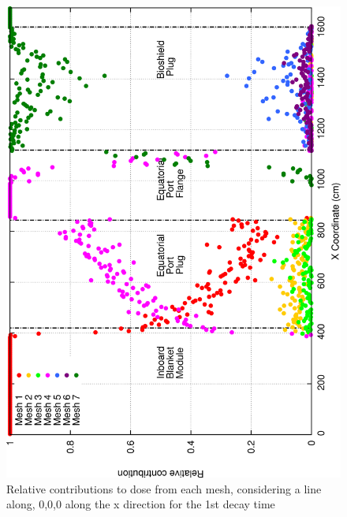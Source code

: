 \documentclass[12pt]{article}
\begin{document}
\begin{figure}[ht!]
\centering
\includegraphics[clip,scale=0.25]{../plots/crosstalk/nob4c/ep/dc1_rel.png}
\caption{Relative contributions to dose from each mesh, considering a line along, 0,0,0 along the x direction for the 1st decay time}
\label{fig:ct_ep_dc1_rel}
\end{figure}
\end{document}
